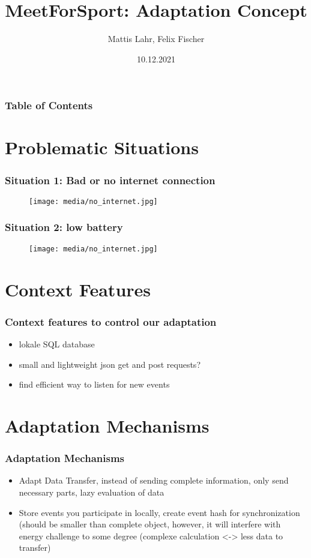 \documentclass[aspectratio=169]{beamer}
\title{MeetForSport: Adaptation Concept}
\author{Mattis Lahr, Felix Fischer}
\date{10.12.2021}
\begin{document}
\maketitle



\begin{frame}
    \frametitle{Table of Contents}
    \tableofcontents
\end{frame}




\section{Problematic Situations}
\begin{frame}   
	\frametitle{Situation 1:  Bad or no internet connection}
	 \begin{figure}
		\centering
		\texttt{[image: media/no\_internet.jpg]}
	\end{figure}
\end{frame}
\begin{frame}   
	\frametitle{Situation 2: low battery}
	 \begin{figure}
		\centering
		\texttt{[image: media/no\_internet.jpg]}
	\end{figure}
\end{frame}




\section{Context Features}
\begin{frame}   
	\frametitle{Context features to control our adaptation}
	\begin{itemize}
		\item lokale SQL database
		\item small and lightweight json get and post requests?
		\item find efficient way to listen for new events
	\end{itemize}
\end{frame}




\section{Adaptation Mechanisms}
\begin{frame}   
	\frametitle{Adaptation Mechanisms}
	\begin{itemize}
		\item Adapt Data Transfer, instead of sending complete information, only send necessary parts, lazy evaluation of data
		\item Store events you participate in locally, create event hash for synchronization (should be smaller than complete object, however, it will interfere with energy challenge to some degree (complexe calculation <-> less data to transfer) 
	\end{itemize}
\end{frame}
\end{document}
